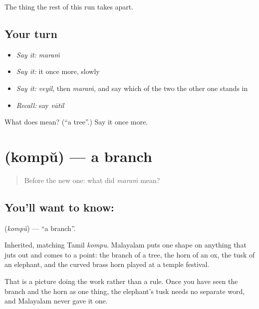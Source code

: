 \begin{grammarlens}[title={What you've built}]
The thing the rest of this run takes apart.
\end{grammarlens}

\subsection*{Your turn}
\begin{itemize}
\raggedright
  \item \emph{Say it:} \emph{maraṁ}
  \item \emph{Say it:} it once more, slowly
  \item \emph{Say it:} \emph{veyil}, then \emph{maraṁ}, and say which of the two the other one stands in
  \item \emph{Recall:} say \emph{vātil}
\end{itemize}

\begin{tcolorbox}[breakable,colback=teal!4,colframe=teal!35!black,title={Before you move on}]
What does  mean? (\textquotedblleft{}a tree\textquotedblright{}.) Say it once more.
\end{tcolorbox}
\section[\texorpdfstring{\ml{കൊമ്പ്} (kompŭ)}{കൊമ്പ് (kompŭ)}]{ (kompŭ) — a branch}

\label{lesson:ML-C54-branch}



\begin{quote}
Before the new one: what did \emph{maraṁ} mean?
\end{quote}

\subsection*{You'll want to know: }
\textbf{} (\emph{kompŭ}) — \textquotedblleft{}a branch\textquotedblright{}.

Inherited, matching Tamil \emph{kompu}. Malayalam puts one shape on anything that juts out and comes to a point: the branch of a tree, the horn of an ox, the tusk of an elephant, and the curved brass horn played at a temple festival.

That is a picture doing the work rather than a rule. Once you have seen the branch and the horn as one thing, the elephant's tusk needs no separate word, and Malayalam never gave it one.

